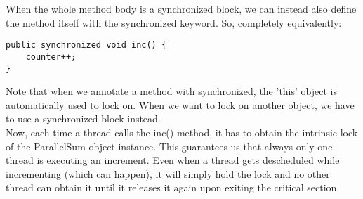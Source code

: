 \documentclass[main.tex]{subfiles}
\begin{document}
When the whole method body is a synchronized block, we can instead also define the method itself with the synchronized keyword. So, completely equivalently:
\begin{verbatim}
public synchronized void inc() {
    counter++;
}
\end{verbatim}
Note that when we annotate a method with synchronized, the 'this' object is automatically used to lock on. When we want to lock on another object, we have to use a synchronized block instead.\\
Now, each time a thread calls the inc() method, it has to obtain the intrinsic lock of the ParallelSum object instance. This guarantees us that always only one thread is executing an increment. Even when a thread gets descheduled while incrementing (which can happen), it will simply hold the lock and no other thread can obtain it until it releases it again upon exiting the critical section.
\end{document}
